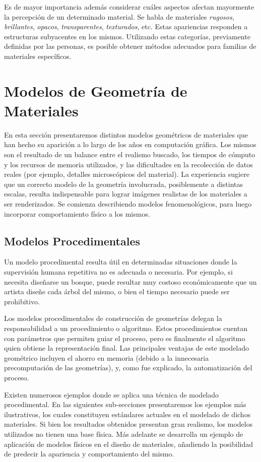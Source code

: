 Es de mayor importancia además considerar cuáles aspectos afectan mayormente la percepción de un determinado material.
Se habla de materiales {\em rugosos}, {\em brillantes}, {\em opacos}, {\em transparentes}, {\em texturados}, etc.
Estas apariencias responden a estructuras subyacentes en los mismos.
Utilizando estas categorías, previamente definidas por las personas, es posible obtener métodos adecuados para familias de materiales específicos.

\section{Modelos de Geometría de Materiales}
En esta sección presentaremos distintos modelos geométricos de materiales que han hecho su aparición a lo largo de los años en computación gráfica.
Los mismos son el resultado de un balance entre el realismo buscado, los tiempos de cómputo y los recursos de memoria utilizados, y las dificultades en la recolección de datos reales (por ejemplo, detalles microscópicos del material).
La experiencia sugiere que un correcto modelo de la geometría involucrada, posiblemente a distintas escalas, resulta indispensable para lograr imágenes realistas de los materiales a ser renderizados.
Se comienza describiendo modelos fenomenológicos, para luego incorporar comportamiento físico a los mismos.

\subsection{Modelos Procedimentales}
Un modelo procedimental resulta útil en determinadas situaciones donde la supervisión humana repetitiva no es adecuada o necesaria.
Por ejemplo, si necesita diseñarse un bosque, puede resultar muy costoso económicamente que un artista diseñe cada árbol del mismo, o bien el tiempo necesario puede ser prohibitivo.

Los modelos procedimentales de construcción de geometrías delegan la responsabilidad a un procedimiento o algoritmo.
Estos procedimientos cuentan con parámetros que permiten guiar el proceso, pero es finalmente el algoritmo quien obtiene la representación final.
Las principales ventajas de este modelado geométrico incluyen el ahorro en memoria (debido a la innecesaria precomputación de las geometrías), y, como fue explicado, la automatización del proceso.

Existen numerosos ejemplos donde se aplica una técnica de modelado procedimental.
En las siguientes sub-secciones presentaremos los ejemplos más ilustrativos, los cuales constituyen estándares actuales en el modelado de dichos materiales.
Si bien los resultados obtenidos presentan gran realismo, los modelos utilizados no tienen una base física.
Más adelante se desarrolla un ejemplo de aplicación de modelos físicos en el diseño de materiales, añadiendo la posibilidad de predecir la apariencia y comportamiento del mismo.



